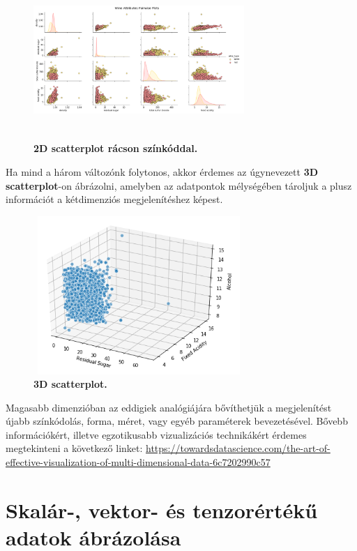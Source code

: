 \documentclass[12pt]{article}
\theoremstyle{plain}
\begin{document}
\begin{figure}[H]
   \centering
   \includegraphics[width=8cm, height=6cm]{media/3dscatter.png}
   \caption{\textbf{2D scatterplot rácson színkóddal.}}
   \label{fig:GeneralDiagram}
\end{figure}

Ha mind a három változónk folytonos, akkor érdemes az úgynevezett \textbf{3D scatterplot}-on ábrázolni, amelyben az adatpontok mélységében tároljuk a plusz információt a kétdimenziós megjelenítéshez képest.

\begin{figure}[H]
   \centering
   \includegraphics[width=8cm, height=6cm]{media/3dcont.png}
   \caption{\textbf{3D scatterplot.}}
   \label{fig:GeneralDiagram}
\end{figure}

Magasabb dimenzióban az eddigiek analógiájára bővíthetjük a megjelenítést újabb színkódolás, forma, méret, vagy egyéb paraméterek bevezetésével. 
Bővebb információkért, illetve egzotikusabb vizualizációs technikákért érdemes megtekinteni a következő linket: \url{https://towardsdatascience.com/the-art-of-effective-visualization-of-multi-dimensional-data-6c7202990c57}

\section{Skalár-, vektor- és tenzorértékű adatok ábrázolása}
\end{document}
